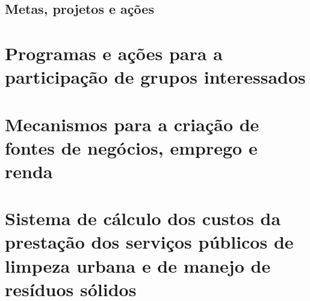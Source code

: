 \subsection{Metas, projetos e ações}

\FloatBarrier
\newpage
\section{Programas e ações para a participação de grupos interessados}
\label{sec:grup_int}

\FloatBarrier
\newpage
\section{Mecanismos para a criação de fontes de negócios, emprego e renda}
\label{sec:mec_renda}

\newpage
\section{Sistema de cálculo dos custos da prestação dos serviços públicos de limpeza urbana e de manejo de resíduos sólidos}
\label{sec:calculo_custo}

